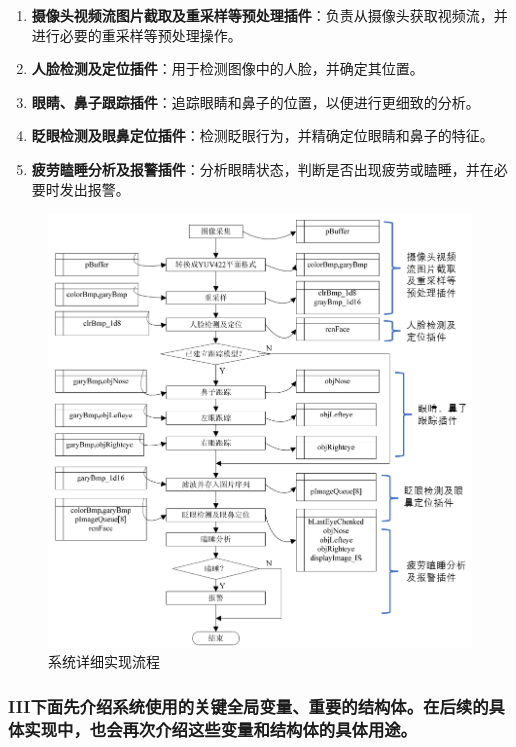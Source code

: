 \documentclass[12pt,hyperref,a4paper,UTF8]{ctexart}
\begin{document}
        \begin{enumerate}[label=\arabic*),itemsep=1ex]
            \item \textbf{摄像头视频流图片截取及重采样等预处理插件}：负责从摄像头获取视频流，并进行必要的重采样等预处理操作。
            \item \textbf{人脸检测及定位插件}：用于检测图像中的人脸，并确定其位置。
            \item \textbf{眼睛、鼻子跟踪插件}：追踪眼睛和鼻子的位置，以便进行更细致的分析。
            \item \textbf{眨眼检测及眼鼻定位插件}：检测眨眼行为，并精确定位眼睛和鼻子的特征。
            \item \textbf{疲劳瞌睡分析及报警插件}：分析眼睛状态，判断是否出现疲劳或瞌睡，并在必要时发出报警。
        \end{enumerate}
       
        \begin{figure}[H]
            \centering
            \includegraphics[width=\textwidth]{./figures/fig/image1.png}
            \caption{系统详细实现流程}
            \label{fig:your_image_label}
        \end{figure}



        \subsubsection*{III下面先介绍系统使用的关键全局变量、重要的结构体。在后续的具体实现中，也会再次介绍这些变量和结构体的具体用途。}
\end{document}
